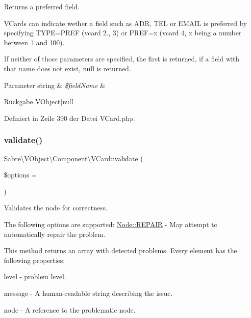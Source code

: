 Returns a preferred field.

V\+Cards can indicate wether a field such as A\+DR, T\+EL or E\+M\+A\+IL is preferred by specifying T\+Y\+PE=P\+R\+EF (vcard 2., 3) or P\+R\+EF=x (vcard 4, x being a number between 1 and 100).

If neither of those parameters are specified, the first is returned, if a field with that name does not exist, null is returned.


\begin{DoxyParams}[1]{Parameter}
string & {\em \$field\+Name} & \\
\hline
\end{DoxyParams}
\begin{DoxyReturn}{Rückgabe}
V\+Object$\vert$null 
\end{DoxyReturn}


Definiert in Zeile 390 der Datei V\+Card.\+php.

\mbox{\label{class_sabre_1_1_v_object_1_1_component_1_1_v_card_a0732946b8d61dd5b3a632f376501b031}} 
\subsubsection{\texorpdfstring{validate()}{validate()}}
{\footnotesize\ttfamily Sabre\textbackslash{}\+V\+Object\textbackslash{}\+Component\textbackslash{}\+V\+Card\+::validate (\begin{DoxyParamCaption}\item[{}]{\$options = {} }\end{DoxyParamCaption})}

Validates the node for correctness.

The following options are supported\+: \mbox{\hyperlink{class_sabre_1_1_v_object_1_1_node_ac97a7fb85c1f871523336cd1ec6b29a9}{Node\+::\+R\+E\+P\+A\+IR}} -\/ May attempt to automatically repair the problem.

This method returns an array with detected problems. Every element has the following properties\+:


\begin{DoxyItemize}
\item level -\/ problem level.
\item message -\/ A human-\/readable string describing the issue.
\item node -\/ A reference to the problematic node.
\end{DoxyItemize}

